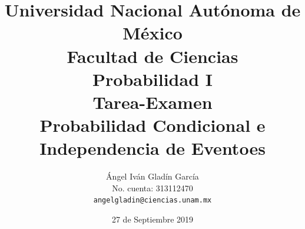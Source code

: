 \documentclass[11pt,letterpaper]{report}
\begin{document}
\title{
        Universidad Nacional Autónoma de México\\
        Facultad de Ciencias\\
        Probabilidad I\\
    \vspace{1cm}
    \large
        \textbf{Tarea-Examen}\\
        \textbf{Probabilidad Condicional e Independencia de Eventoes}
}
\author{
    Ángel Iván Gladín García\\
    No. cuenta: 313112470\\
    \texttt{angelgladin@ciencias.unam.mx}
}
\date{27 de Septiembre 2019}
\maketitle

\newtheorem{theorem}{Teorema}
\newtheorem{example}{Ejemplo}
\newtheorem{corollary}{Corolario}
\newtheorem{lemma}{Lemma}
\newtheorem{definition}{Definicion}
\newtheorem{prop}{Proposicion}
\end{document}
